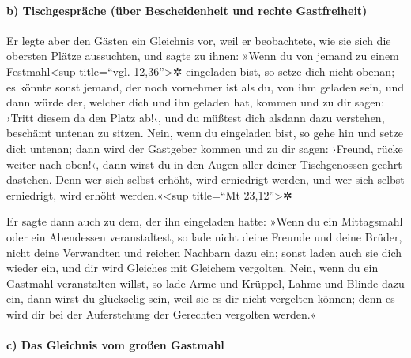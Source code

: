 \hypertarget{b-tischgespruxe4che-uxfcber-bescheidenheit-und-rechte-gastfreiheit}{%
\paragraph{b) Tischgespräche (über Bescheidenheit und rechte
Gastfreiheit)}\label{b-tischgespruxe4che-uxfcber-bescheidenheit-und-rechte-gastfreiheit}}

 Er legte aber den Gästen ein Gleichnis vor, weil er
beobachtete, wie sie sich die obersten Plätze aussuchten, und sagte zu
ihnen:  »Wenn du von jemand zu einem Festmahl\textless sup
title=``vgl. 12,36''\textgreater✲ eingeladen bist, so setze dich nicht
obenan; es könnte sonst jemand, der noch vornehmer ist als du, von ihm
geladen sein,  und dann würde der, welcher dich und ihn
geladen hat, kommen und zu dir sagen: ›Tritt diesem da den Platz ab!‹,
und du müßtest dich alsdann dazu verstehen, beschämt untenan zu sitzen.
 Nein, wenn du eingeladen bist, so gehe hin und setze
dich untenan; dann wird der Gastgeber kommen und zu dir sagen: ›Freund,
rücke weiter nach oben!‹, dann wirst du in den Augen aller deiner
Tischgenossen geehrt dastehen.  Denn wer sich selbst
erhöht, wird erniedrigt werden, und wer sich selbst erniedrigt, wird
erhöht werden.«\textless sup title=``Mt 23,12''\textgreater✲

 Er sagte dann auch zu dem, der ihn eingeladen hatte:
»Wenn du ein Mittagsmahl oder ein Abendessen veranstaltest, so lade
nicht deine Freunde und deine Brüder, nicht deine Verwandten und reichen
Nachbarn dazu ein; sonst laden auch sie dich wieder ein, und dir wird
Gleiches mit Gleichem vergolten.  Nein, wenn du ein
Gastmahl veranstalten willst, so lade Arme und Krüppel, Lahme und Blinde
dazu ein,  dann wirst du glückselig sein, weil sie es dir
nicht vergelten können; denn es wird dir bei der Auferstehung der
Gerechten vergolten werden.«

\hypertarget{c-das-gleichnis-vom-grouxdfen-gastmahl}{%
\paragraph{c) Das Gleichnis vom großen
Gastmahl}\label{c-das-gleichnis-vom-grouxdfen-gastmahl}}

